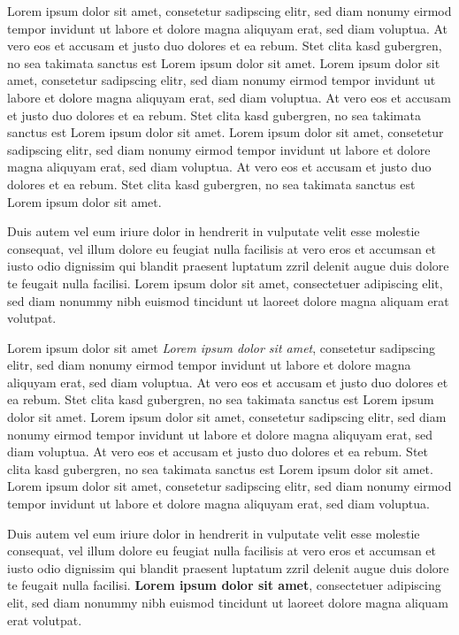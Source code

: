 \documentclass[10pt,twoside,twocolumn,openany,nodeprecatedcode]{dndbook}
\begin{document}
Lorem ipsum dolor sit amet, consetetur sadipscing elitr, sed diam nonumy eirmod tempor invidunt ut labore et dolore magna aliquyam erat, sed diam voluptua. At vero eos et accusam et justo duo dolores et ea rebum. Stet clita kasd gubergren, no sea takimata sanctus est Lorem ipsum dolor sit amet. Lorem ipsum dolor sit amet, consetetur sadipscing elitr, sed diam nonumy eirmod tempor invidunt ut labore et dolore magna aliquyam erat, sed diam voluptua. At vero eos et accusam et justo duo dolores et ea rebum. Stet clita kasd gubergren, no sea takimata sanctus est Lorem ipsum dolor sit amet. Lorem ipsum dolor sit amet, consetetur sadipscing elitr, sed diam nonumy eirmod tempor invidunt ut labore et dolore magna aliquyam erat, sed diam voluptua. At vero eos et accusam et justo duo dolores et ea rebum. Stet clita kasd gubergren, no sea takimata sanctus est Lorem ipsum dolor sit amet.

Duis autem vel eum iriure dolor in hendrerit in vulputate velit esse molestie consequat, vel illum dolore eu feugiat nulla facilisis at vero eros et accumsan et iusto odio dignissim qui blandit praesent luptatum zzril delenit augue duis dolore te feugait nulla facilisi. Lorem ipsum dolor sit amet, consectetuer adipiscing elit, sed diam nonummy nibh euismod tincidunt ut laoreet dolore magna aliquam erat volutpat.

\begin{DndReadAloud}{Lorem ipsum dolor sit amet}
\textit{Lorem ipsum dolor sit amet}, consetetur sadipscing elitr, sed diam nonumy eirmod tempor invidunt ut labore et dolore magna aliquyam erat, sed diam voluptua. At vero eos et accusam et justo duo dolores et ea rebum. Stet clita kasd gubergren, no sea takimata sanctus est Lorem ipsum dolor sit amet. Lorem ipsum dolor sit amet, consetetur sadipscing elitr, sed diam nonumy eirmod tempor invidunt ut labore et dolore magna aliquyam erat, sed diam voluptua. At vero eos et accusam et justo duo dolores et ea rebum. Stet clita kasd gubergren, no sea takimata sanctus est Lorem ipsum dolor sit amet. Lorem ipsum dolor sit amet, consetetur sadipscing elitr, sed diam nonumy eirmod tempor invidunt ut labore et dolore magna aliquyam erat, sed diam voluptua.

Duis autem vel eum iriure dolor in hendrerit in vulputate velit esse molestie consequat, vel illum dolore eu feugiat nulla facilisis at vero eros et accumsan et iusto odio dignissim qui blandit praesent luptatum zzril delenit augue duis dolore te feugait nulla facilisi. \textbf{Lorem ipsum dolor sit amet}, consectetuer adipiscing elit, sed diam nonummy nibh euismod tincidunt ut laoreet dolore magna aliquam erat volutpat. 

\end{DndReadAloud}
\end{document}

